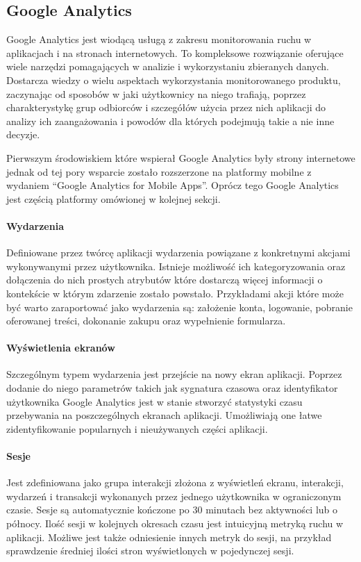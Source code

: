 \subsection{Google Analytics}
\label{sec:ga}
Google Analytics jest wiodącą usługą z zakresu monitorowania ruchu w aplikacjach i na stronach internetowych. To kompleksowe rozwiązanie oferujące wiele narzędzi pomagających w analizie i wykorzystaniu zbieranych danych. Dostarcza wiedzy o wielu aspektach wykorzystania monitorowanego produktu, zaczynając od sposobów w jaki użytkownicy na niego trafiają, poprzez charakterystykę grup odbiorców i szczegółów użycia przez nich aplikacji do analizy ich zaangażowania i powodów dla których podejmują takie a nie inne decyzje.

Pierwszym środowiskiem które wspierał Google Analytics były strony internetowe jednak od tej pory wsparcie zostało rozszerzone na platformy mobilne z wydaniem ``Google Analytics for Mobile Apps''. Oprócz tego Google Analytics jest częścią platformy  omówionej w kolejnej sekcji.

\paragraph{Wydarzenia}
\label{par:ga-events}
Definiowane przez twórcę aplikacji wydarzenia powiązane z konkretnymi akcjami wykonywanymi przez użytkownika. Istnieje możliwość ich kategoryzowania oraz dołączenia do nich prostych atrybutów które dostarczą więcej informacji o kontekście w którym zdarzenie zostało powstało. Przykładami akcji które może być warto zaraportować jako wydarzenia są: założenie konta, logowanie, pobranie oferowanej treści, dokonanie zakupu oraz wypełnienie formularza.

\paragraph{Wyświetlenia ekranów}
Szczególnym typem wydarzenia jest przejście na nowy ekran aplikacji. Poprzez dodanie do niego parametrów takich jak sygnatura czasowa oraz identyfikator użytkownika Google Analytics jest w stanie stworzyć statystyki czasu przebywania na poszczególnych ekranach aplikacji. Umożliwiają one łatwe zidentyfikowanie popularnych i nieużywanych części aplikacji.

\paragraph{Sesje}
Jest zdefiniowana jako grupa interakcji złożona z wyświetleń ekranu, interakcji, wydarzeń i transakcji wykonanych przez jednego użytkownika w ograniczonym czasie. Sesje są automatycznie kończone po 30 minutach bez aktywności lub o północy. Ilość sesji w kolejnych okresach czasu jest intuicyjną metryką ruchu w aplikacji. Możliwe jest także odniesienie innych metryk do sesji, na przykład sprawdzenie średniej ilości stron wyświetlonych w pojedynczej sesji.


